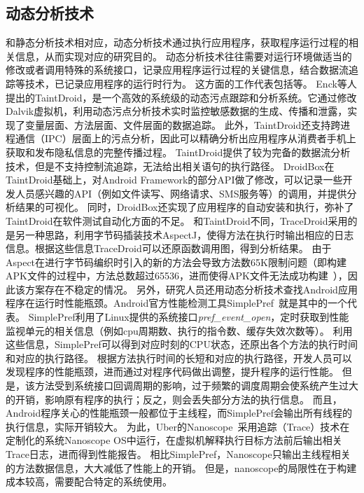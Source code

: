 \subsection{动态分析技术}
和静态分析技术相对应，动态分析技术通过执行应用程序，获取程序运行过程的相关信息，从而实现对应的研究目的。
动态分析技术往往需要对运行环境做适当的修改或者调用特殊的系统接口，记录应用程序运行过程的关键信息，结合数据流追踪等技术，已记录应用程序的运行时行为。
这方面的工作代表包括\cite{chun2014taintdroid,droidbox:online,van2013dynamic,droidscope}等。
Enck等人提出的TaintDroid\cite{chun2014taintdroid}，是一个高效的系统级的动态污点跟踪和分析系统。它通过修改Dalvik虚拟机，利用动态污点分析技术实时监控敏感数据的生成、传播和泄露，实现了变量层面、方法层面、文件层面的数据追踪。
此外，TaintDroid还支持跨进程通信（IPC）层面上的污点分析，因此可以精确分析出应用程序从消费者手机上获取和发布隐私信息的完整传播过程。
TaintDroid提供了较为完备的数据流分析技术，但是不支持控制流追踪，无法给出相关语句的执行路径。
DroidBox\cite{droidbox:online}在TaintDroid基础上，对Android Framework的部分API做了修改，可以记录一些开发人员感兴趣的API（例如文件读写、网络请求、SMS服务等）的调用，并提供分析结果的可视化。
同时，DroidBox还实现了应用程序的自动安装和执行，弥补了TaintDroid在软件测试自动化方面的不足。
和TaintDroid不同，TraceDroid\cite{van2013dynamic}采用的是另一种思路，利用字节码插装技术AspectJ，使得方法在执行时输出相应的日志信息。根据这些信息TraceDroid可以还原函数调用图，得到分析结果。
由于Aspect在进行字节码编织时引入的新的方法会导致方法数65K限制问题（即构建APK文件的过程中，方法总数超过65536，进而使得APK文件无法成功构建~\cite{Configur27}），因此该方案存在不稳定的情况。
\newline
另外，研究人员还用动态分析技术查找Android应用程序在运行时性能瓶颈。Android官方性能检测工具SimplePref~\cite{simpleperf:online}就是其中的一个代表。
SimplePref利用了Linux提供的系统接口\textit{pref\_event\_open}，定时获取到性能监视单元的相关信息（例如cpu周期数、执行的指令数、缓存失效次数等）。
利用这些信息，SimplePref可以得到对应时刻的CPU状态，还原出各个方法的执行时间和对应的执行路径。
根据方法执行时间的长短和对应的执行路径，开发人员可以发现程序的性能瓶颈，进而通过对程序代码做出调整，提升程序的运行性能。
但是，该方法受到系统接口回调周期的影响，过于频繁的调度周期会使系统产生过大的开销，影响原有程序的执行；反之，则会丢失部分方法的执行信息。
而且，Android程序关心的性能瓶颈一般都位于主线程，而SimplePref会输出所有线程的执行信息，实际开销较大。
为此，Uber的Nanoscope~\cite{ubernanoscope:online}采用追踪（Trace）技术在定制化的系统Nanoscope OS中运行，在虚拟机解释执行目标方法前后输出相关Trace日志，进而得到性能报告。
相比SimplePref，Nanoscope只输出主线程相关的方法数据信息，大大减低了性能上的开销。
但是，nanoscope的局限性在于构建成本较高，需要配合特定的系统使用。




